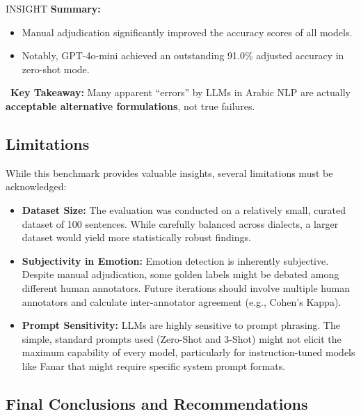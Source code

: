 \begin{reportblock}{INSIGHT}
    \textbf{Summary:}
    \begin{itemize}[label=\faCheck, nosep] %
        \item Manual adjudication significantly improved the accuracy scores of all models.
        \item Notably, \colorbox{cyan!15}{GPT-4o-mini} achieved an \colorbox{cyan!15}{outstanding 91.0\%} adjusted accuracy in zero-shot mode.
    \end{itemize}
    
    \vspace{0.8em}
    \noindent\faExclamationCircle\ \textbf{Key Takeaway:} Many apparent ``errors'' by LLMs in Arabic NLP are actually \textbf{acceptable alternative formulations}, not true failures.
\end{reportblock}

\subsection{Limitations}

While this benchmark provides valuable insights, several limitations must be acknowledged:
\begin{itemize}
    \item \textbf{Dataset Size:} The evaluation was conducted on a relatively small, curated dataset of 100 sentences. While carefully balanced across dialects, a larger dataset would yield more statistically robust findings.
    \item \textbf{Subjectivity in Emotion:} Emotion detection is inherently subjective. Despite manual adjudication, some golden labels might be debated among different human annotators. Future iterations should involve multiple human annotators and calculate inter-annotator agreement (e.g., Cohen's Kappa).
    \item \textbf{Prompt Sensitivity:} LLMs are highly sensitive to prompt phrasing. The simple, standard prompts used (Zero-Shot and 3-Shot) might not elicit the maximum capability of every model, particularly for instruction-tuned models like Fanar that might require specific system prompt formats.
\end{itemize}

\subsection{Final Conclusions and Recommendations}

